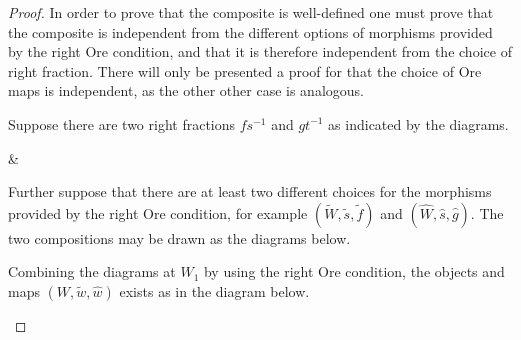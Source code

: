     \begin{proof}
        In order to prove that the composite is well-defined one must prove that the composite is independent from the different options of morphisms provided by the right Ore condition, and that it is therefore independent from the choice of right fraction. There will only be presented a proof for that the choice of Ore maps is independent, as the other other case is analogous.

        Suppose there are two right fractions $fs^{-1}$ and $gt^{-1}$ as indicated by the diagrams.

        \begin{center}
            \&
        \end{center}
        Further suppose that there are at least two different choices for the morphisms provided by the right Ore condition, for example $(\widetilde{W},\widetilde{s},\widetilde{f})$ and $(\widehat{W},\widehat{s}, \widehat{g})$. The two compositions may be drawn as the diagrams below.
        \begin{center}
        \end{center}
        Combining the diagrams at $W_1$ by using the right Ore condition, the objects and maps  $(W, \widetilde{w}, \widehat{w})$ exists as in the diagram below. 
        \begin{center}
\end{center}
\end{proof}
